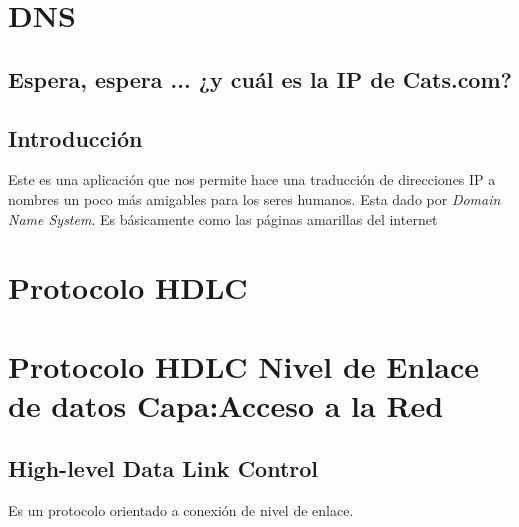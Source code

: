 \documentclass[12pt, fleqn]{report}                             %
\theoremstyle{break}                                            %
\begin{document}
    \chapter{DNS}
    \section*{Espera, espera ... ¿y cuál es la IP de Cats.com?}


        \clearpage
        \section{Introducción}

            Este es una aplicación que nos permite hace una traducción de direcciones IP a
            nombres un poco más amigables para los seres humanos.
            Esta dado por \emph{Domain Name System}. Es básicamente como las páginas
            amarillas del internet




    \chapter{Protocolo HDLC}
    \chapter{Protocolo HDLC Nivel de Enlace de datos Capa:Acceso a la Red}
        \section{High-level Data Link Control}
        Es un protocolo orientado a conexión de nivel de enlace.
\end{document}
